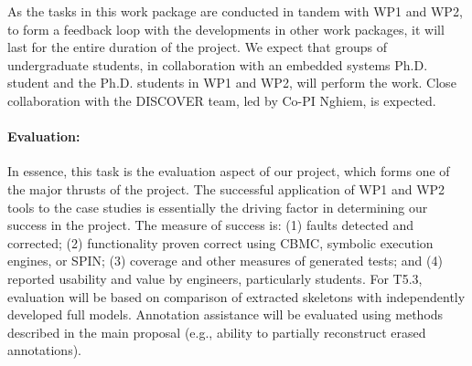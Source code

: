 As the tasks in this work package are conducted in tandem with WP1 and WP2, to form a feedback loop with the developments in other work packages, it will last for the entire duration of the project.
We expect that groups of undergraduate students, in collaboration with
an embedded systems Ph.D. student and the Ph.D. students in WP1 and WP2, will
perform the work.
Close collaboration with the DISCOVER team, led by Co-PI Nghiem, is expected.

\paragraph{Evaluation:} In essence, this task is the evaluation
aspect of our project, which forms one of the major thrusts of the
project.  The successful application of WP1 and WP2 tools to the case
studies is essentially the driving factor in determining our success
in the project.
The measure of success is: (1) faults detected and corrected; (2)
functionality proven correct using CBMC, symbolic execution engines,
or SPIN; (3) coverage and other measures of generated tests; and (4)
reported usability and value by engineers,
particularly students.  For T5.3, evaluation will be based on
comparison of extracted skeletons with independently developed full 
models.  Annotation assistance will be evaluated using methods
described in the main proposal (e.g., ability to partially reconstruct
erased annotations).
